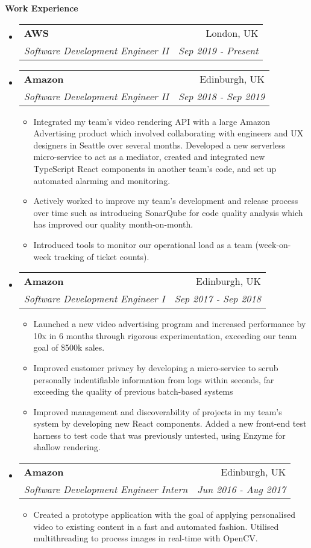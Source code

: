 \documentclass[letterpaper,11pt]{article}
\makeatletter
\newcommand{\resitem}[1]{\item #1 \vspace{-2pt}}
\newcommand{\resheading}[1]{{\large \colorbox{mygrey}{\begin{minipage}{\textwidth}{\textbf{#1 \vphantom{p\^{E}}}}\end{minipage}}}}
\newcommand{\ressubheading}[4]{
\begin{tabular*}{7.0in}{l@{\extracolsep{\fill}}r}
	\textbf{#1} & #2 \\
	\textit{#3} & \textit{#4} \\
\end{tabular*}\vspace{-6pt}}
\makeatother
\begin{document}
	\resheading{Work Experience}
	\begin{itemize}
		\item
		\ressubheading{AWS}{London, UK}{Software Development Engineer II}{Sep 2019 - Present}

		\item
		\ressubheading{Amazon}{Edinburgh, UK}{Software Development Engineer II}{Sep 2018 - Sep 2019}
		\begin{itemize}
			\resitem{Integrated my team's video rendering API with a large Amazon Advertising product which involved collaborating with engineers and UX designers in Seattle over several months. Developed a new serverless micro-service to act as a mediator, created and integrated new TypeScript React components in another team's code, and set up automated alarming and monitoring.}
			\resitem{Actively worked to improve my team's development and release process over time such as introducing SonarQube for code quality analysis which has improved our quality month-on-month.}
			\resitem{Introduced tools to monitor our operational load as a team (week-on-week tracking of ticket counts).}
		\end{itemize}

		\item
		\ressubheading{Amazon}{Edinburgh, UK}{Software Development Engineer I}{Sep 2017 - Sep 2018}
		\begin{itemize}
			\resitem{Launched a new video advertising program and increased performance by 10x in 6 months through rigorous experimentation, exceeding our team goal of \$500k sales.}
			\resitem{Improved customer privacy by developing a micro-service to scrub personally indentifiable information from logs within seconds, far exceeding the quality of previous batch-based systems}
			\resitem{Improved management and discoverability of projects in my team's system by developing new React components. Added a new front-end test harness to test code that was previously untested, using Enzyme for shallow rendering.}
		\end{itemize}

		\item
		\ressubheading{Amazon}{Edinburgh, UK}{Software Development Engineer Intern}{Jun 2016 - Aug 2017}
		\begin{itemize}
			\resitem{Created a prototype application with the goal of applying personalised video to existing content in a fast
			and automated fashion. Utilised multithreading to process images in real-time with OpenCV.}
		\end{itemize}


\end{itemize}
\end{document}

